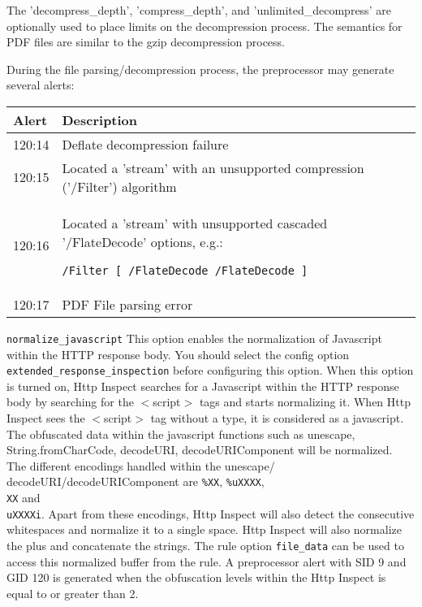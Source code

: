 \documentclass[english]{report}
\newcounter{slistnum}
\newenvironment{slist}
{ \begin{list}{ {\bf \arabic{slistnum}.} }{\usecounter{slistnum} } }
{ \end{list} }
\begin{document}
\begin{slist}
The 'decompress\_depth', 'compress\_depth', and 'unlimited\_decompress' are optionally used to 
place limits on the decompression process.  The semantics for PDF files are similar to the
gzip decompression process.

During the file parsing/decompression process, the preprocessor may generate several alerts:

\begin{center}
\begin{tabular}{| l | p{4.5in} |}

\hline
\textbf{Alert} & \textbf{Description}\\
\hline 

\hline 
120:14 & Deflate decompression failure \\

\hline 
120:15 & Located a 'stream' with an unsupported compression ('/Filter') algorithm \\

\hline 
120:16 & Located a 'stream' with unsupported cascaded '/FlateDecode' options, e.g.: \begin{verbatim}/Filter [ /FlateDecode /FlateDecode ]\end{verbatim} \\

\hline 
120:17 & PDF File parsing error \\

\hline
\end{tabular}
\end{center}

\item \texttt{normalize\_javascript}
This option enables the normalization of Javascript within the HTTP response body.
You should select the config option \texttt{extended\_response\_inspection} before configuring 
this option. When this option is turned on, Http Inspect searches for a Javascript within the 
HTTP response body by searching for the $<$script$>$ tags and starts normalizing it. 
When Http Inspect sees the $<$script$>$ tag without a type, it is considered as a javascript.
The obfuscated data within the javascript functions such as unescape, String.fromCharCode, decodeURI, 
decodeURIComponent will be normalized. The different encodings handled within the unescape/
decodeURI/decodeURIComponent are \texttt{\%XX}, \texttt{\%uXXXX}, \texttt{\\XX} and \texttt{\\uXXXXi}. 
Apart from these encodings, Http Inspect will also detect the consecutive whitespaces and normalize 
it to a single space. Http Inspect will also normalize the plus and concatenate the strings. 
The rule option \texttt{file\_data} can be used to access this normalized buffer from the rule.
A preprocessor alert with SID 9 and GID 120 is generated when the obfuscation levels within the 
Http Inspect is equal to or greater than 2.


\end{slist}
\end{document}

